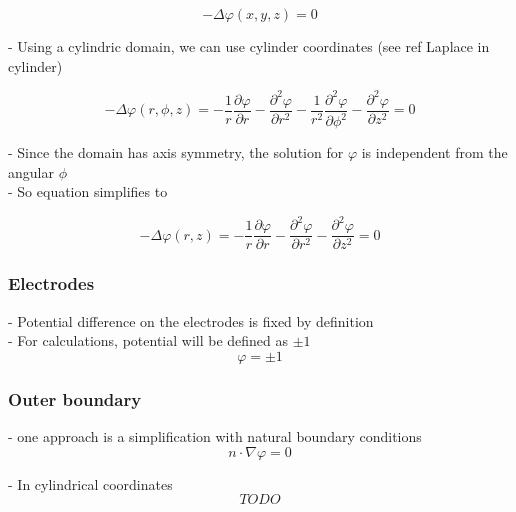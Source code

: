 \documentclass[parskip=half, titlepage=yes, 12pt, BCOR=12mm, DIV=calc]{scrartcl}
\begin{document}
\begin{equation}
    - \Delta \varphi(x,y,z) = 0
\end{equation}

- Using a cylindric domain, we can use cylinder coordinates (see ref Laplace in cylinder)

\begin{equation}
    - \Delta \varphi(r,\phi,z) = - \frac{1}{r} \frac{\partial \varphi}{\partial r} - \frac{\partial^2 \varphi}{\partial r^2} - \frac{1}{r^2} \frac{\partial^2 \varphi}{\partial \phi^2} -      \frac{\partial^2 \varphi}{\partial z^2}  = 0
\end{equation}

- Since the domain has axis symmetry, the solution for $\varphi$ is independent from the angular $\phi$ \\
- So equation simplifies to 

\begin{equation}
    - \Delta \varphi(r,z) = - \frac{1}{r} \frac{\partial \varphi}{\partial r} - \frac{\partial^2 \varphi}{\partial r^2} - \frac{\partial^2 \varphi}{\partial z^2} = 0
\end{equation}


\subsubsection{Electrodes}

- Potential difference on the electrodes is fixed by definition \\
- For calculations, potential will be defined as $\pm 1$ \\

\begin{equation}
    \varphi = \pm 1
\end{equation}


\subsubsection{Outer boundary}

- one approach is a simplification with natural boundary conditions \\

\begin{equation}
    n \cdot \nabla \varphi = 0
\end{equation}

- In cylindrical coordinates
\begin{equation}
    TODO
\end{equation}
\end{document}
